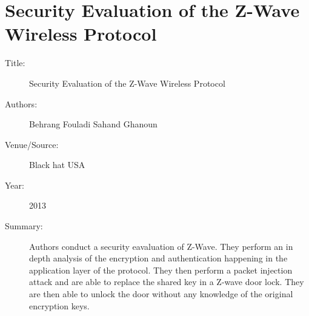 \documentclass[letterpaper,12pt]{article}
\begin{document}
\section{Security Evaluation of the Z-Wave Wireless Protocol~\cite{zwavesecurity}}
\begin{description}
 \item[Title:] Security Evaluation of the Z-Wave Wireless Protocol
 \item[Authors:] Behrang Fouladi Sahand Ghanoun
 \item[Venue/Source:] Black hat USA
 \item[Year:] 2013
 \item[Summary:] Authors conduct a security eavaluation of Z-Wave. They perform an in depth analysis of the encryption and authentication happening in the application layer of the protocol. They then perform a packet injection attack and are able to replace the shared key in a Z-wave door lock. They are then able to unlock the door without any knowledge of the original encryption keys.
\end{description}



\end{document}
